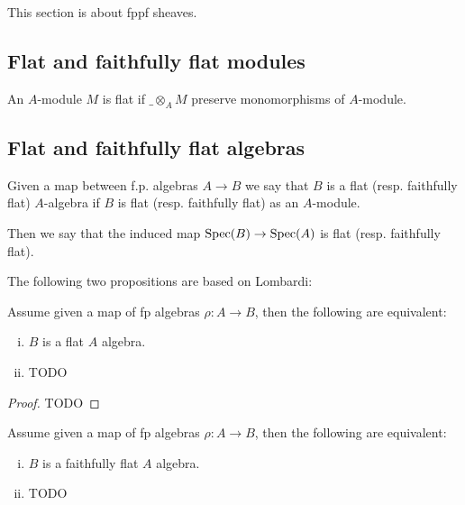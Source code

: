 This section is about fppf sheaves.

\subsection{Flat and faithfully flat modules}

\begin{definition}
An $A$-module $M$ is flat if $\_\otimes_AM$ preserve monomorphisms of $A$-module.
\end{definition}

\begin{lemma}

\end{lemma}

\subsection{Flat and faithfully flat algebras}

\begin{definition}
Given a map between f.p. algebras $A\to B$ we say that $B$ is a flat (resp. faithfully flat) $A$-algebra if $B$ is flat (resp. faithfully flat) as an $A$-module.

Then we say that the induced map $\operatorname{Spec}(B)\to \operatorname{Spec}(A)$ is flat (resp. faithfully flat).
\end{definition}

The following two propositions are based on Lombardi:

\begin{proposition}
Assume given a map of fp algebras $\rho:A\to B$, then the following are equivalent:
\begin{enumerate}[(i)]
\item $B$ is a flat $A$ algebra.
\item TODO
\end{enumerate}
\end{proposition}

\begin{proof}
TODO
\end{proof}

\begin{proposition}
Assume given a map of fp algebras $\rho:A\to B$, then the following are equivalent:
\begin{enumerate}[(i)]
\item $B$ is a faithfully flat $A$ algebra.
\item TODO
\end{enumerate}
\end{proposition}

